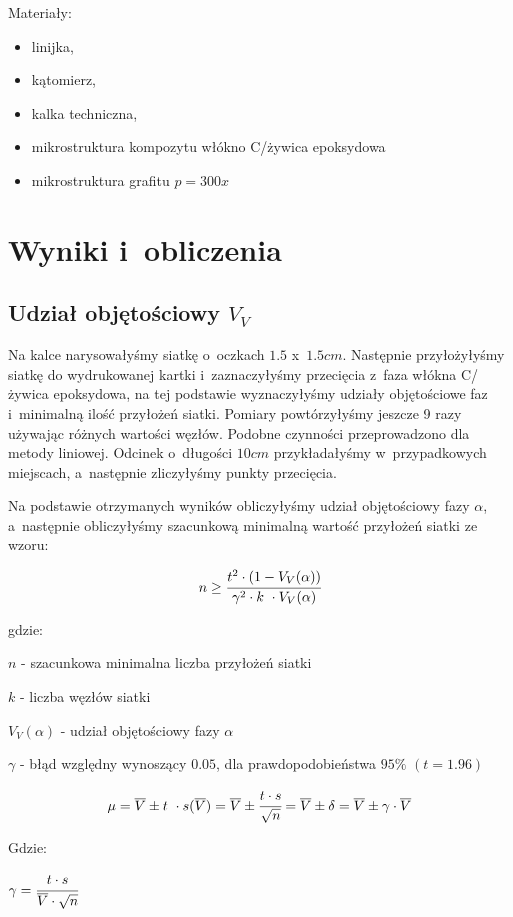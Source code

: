 \documentclass[a4paper,12pt]{article}
\begin{document}
Materiały:
\begin{itemize}
    \item linijka,
    \item kątomierz,
    \item kalka techniczna,
    \item mikrostruktura kompozytu włókno C/żywica epoksydowa
    \item mikrostruktura grafitu $p=300x$
\end{itemize}


\section{Wyniki i~obliczenia}

\subsection{Udział objętościowy $V_V$}

Na kalce narysowałyśmy siatkę o~oczkach $1.5$ x~$1.5 cm$. Następnie przyłożyłyśmy siatkę do wydrukowanej kartki i~zaznaczyłyśmy przecięcia z~faza włókna C/żywica epoksydowa, na tej podstawie wyznaczyłyśmy udziały objętościowe faz i~minimalną ilość przyłożeń siatki. Pomiary powtórzyłyśmy jeszcze 9 razy używając różnych wartości węzłów. Podobne czynności przeprowadzono dla metody liniowej. Odcinek o~długości $10cm$ przykładałyśmy w~przypadkowych miejscach, a~następnie zliczyłyśmy punkty przecięcia. 

Na podstawie otrzymanych wyników obliczyłyśmy udział objętościowy fazy $\alpha$, a~następnie obliczyłyśmy szacunkową minimalną wartość przyłożeń siatki ze wzoru:

$$n\ge \cfrac{t^2 \cdot (1-V_V(\alpha))}{\gamma^2 \cdot k~\cdot V_V(\alpha)}$$

gdzie:

$n$ - szacunkowa minimalna liczba przyłożeń siatki

$k$ - liczba węzłów siatki

$V_V(\alpha)$ - udział objętościowy fazy $\alpha$

$\gamma$ - błąd względny wynoszący $0.05$, dla prawdopodobieństwa $95\%$ $(t=1.96)$
\newpage

$$\mu=\overline{V}\pm t~\cdot s(\overline{V})=\overline{V}\pm \cfrac{t\cdot s}{\sqrt{n}}=\overline{V}\pm \delta = \overline{V}\pm \gamma \cdot \overline{V}$$

Gdzie:

$\gamma=\cfrac{t\cdot s}{\overline{V}\cdot \sqrt{n}}$
\end{document}
